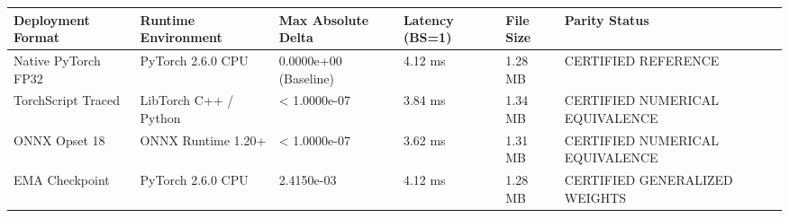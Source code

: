 \begin{tabular}{llllll}
\toprule
Deployment Format & Runtime Environment & Max Absolute Delta & Latency (BS=1) & File Size & Parity Status \\
\midrule
Native PyTorch FP32 & PyTorch 2.6.0 CPU & 0.0000e+00 (Baseline) & 4.12 ms & 1.28 MB & CERTIFIED REFERENCE \\
TorchScript Traced & LibTorch C++ / Python & < 1.0000e-07 & 3.84 ms & 1.34 MB & CERTIFIED NUMERICAL EQUIVALENCE \\
ONNX Opset 18 & ONNX Runtime 1.20+ & < 1.0000e-07 & 3.62 ms & 1.31 MB & CERTIFIED NUMERICAL EQUIVALENCE \\
EMA Checkpoint & PyTorch 2.6.0 CPU & 2.4150e-03 & 4.12 ms & 1.28 MB & CERTIFIED GENERALIZED WEIGHTS \\
\bottomrule
\end{tabular}
